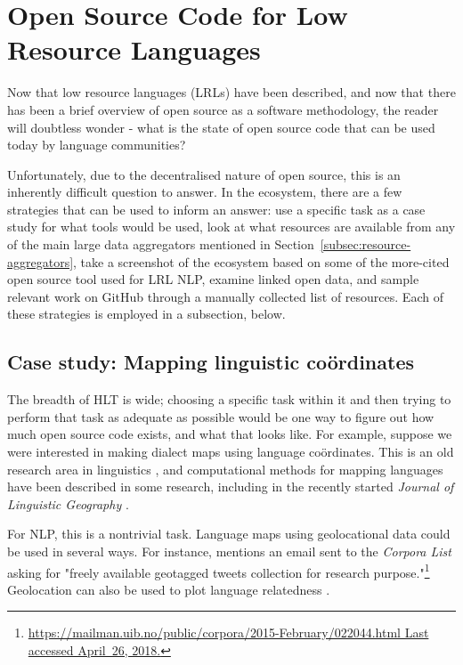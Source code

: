\section{Open Source Code for Low Resource Languages}
\label{sec:endlangcode}

Now that low resource languages (LRLs) have been described, and now that there has been a brief overview of open source as a software methodology, the reader will doubtless wonder - what is the state of open source code that can be used today by language communities?

Unfortunately, due to the decentralised nature of open source, this is an inherently difficult question to answer. In the ecosystem, there are a few strategies that can be used to inform an answer: use a specific task as a case study for what tools would be used, look at what resources are available from any of the main large data aggregators mentioned in Section~\ref{subsec:resource-aggregators}, take a screenshot of the ecosystem based on some of the more-cited open source tool used for LRL NLP, examine linked open data, and sample relevant work on GitHub through a manually collected list of resources. Each of these strategies is employed in a subsection, below.

\subsection{Case study: Mapping linguistic co\"ordinates}

The breadth of HLT is wide; choosing a specific task within it and then trying to perform that task as adequate as possible would be one way to figure out how much open source code exists, and what that looks like. For example, suppose we were interested in making dialect maps using language co\"ordinates. This is an old research area in linguistics \citep{trudgill1983on,labov2005atlas}, and computational methods for mapping languages have been described in some research, including in the recently started {\it Journal of Linguistic Geography} \citep{labov2012journal}.

For NLP, this is a nontrivial task. Language maps using geolocational data could be used in several ways. For instance, \citep{mccrae2015reconciling} mentions an email sent to the {\it Corpora List} asking for "freely available geotagged tweets collection for research purpose."\footnote{\href{https://mailman.uib.no/public/corpora/2015-February/022044.html}{https://mailman.uib.no/public/corpora/2015-February/022044.html Last accessed April~26, 2018.}} Geolocation can also be used to plot language relatedness \citep{littauer2012visualizing}.

